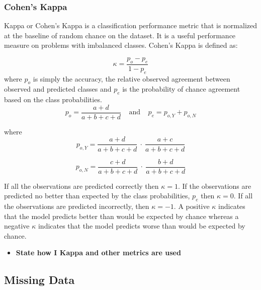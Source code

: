 \documentclass[12pt,]{article}
\providecommand{\tightlist}{%
  \setlength{\itemsep}{0pt}\setlength{\parskip}{0pt}}
\begin{document}
\subsubsection{Cohen's Kappa}\label{cohens-kappa}

Kappa or Cohen's Kappa \autocite{cohen_coefficient_1960} is a
classification performance metric that is normalized at the baseline of
random chance on the dataset. It is a useful performance measure on
problems with imbalanced classes. Cohen's Kappa is defined as:

\[
\kappa = \frac{p_o - p_e}{1 - p_e}
\] where \(p_o\) is simply the accuracy, the relative observed agreement
between observed and predicted classes and \(p_e\) is the probability of
chance agreement based on the class probabilities. \[
p_o = \frac{a+d}{a+b+c+d}  ~~~~~\text{and}~~~~~ p_e = p_{o,Y} + p_{o,N} 
\]

where \[
p_{o,Y} = \frac{a+d}{a+b+c+d} ~\cdot~ \frac{a+c}{a+b+c+d}
\]

\[
p_{o,N} = \frac{c+d}{a+b+c+d} ~\cdot~ \frac{b+d}{a+b+c+d}
\]

If all the observations are predicted correctly then \(\kappa=1\). If
the observations are predicted no better than expected by the class
probabilities, \(p_e\) then \(\kappa=0\). If all the observations are
predicted incorrectly, then \(\kappa=-1\). A positive \(\kappa\)
indicates that the model predicts better than would be expected by
chance whereas a negative \(\kappa\) indicates that the model predicts
worse than would be expected by chance.

\begin{itemize}
\tightlist
\item
  \textbf{State how I Kappa and other metrics are used}
\end{itemize}

\subsection{Missing Data}\label{missing-data}
\end{document}
